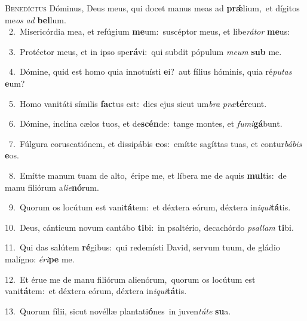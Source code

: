 \lettrine{\initial\textcolor{\initialcolor}{B}}{enedíctus} Dóminus, Deus meus, qui docet manus meas ad \textbf{prǽ}\-lium,~\star et dígitos me\textit{os} \textit{ad} \textbf{bel}\-lum.\\
{\numbfont\textcolor{\numbcolor}{~2.}}~Misericórdia mea, et refúgium \textbf{me}\-um:~\star suscéptor meus, et libe\-\textit{rá}\-\textit{tor} \textbf{me}\-us:\par
{\numbfont\textcolor{\numbcolor}{~3.}}~Protéctor meus, et in ipso spe\-\textbf{rá}\-vi:~\star qui subdit pópulum \textit{me}\-\textit{um} \textbf{sub} me.\par
{\numbfont\textcolor{\numbcolor}{~4.}}~Dómine, quid est homo quia innotuísti \textbf{e}\-i?~\star aut fílius hóminis, quia ré\-\textit{pu}\-\textit{tas} \textbf{e}\-um?\par
{\numbfont\textcolor{\numbcolor}{~5.}}~Homo vanitáti símilis \textbf{fac}\-tus est:~\star dies ejus sicut um\textit{bra} \textit{præ}\-\textbf{tér}eunt.\par
{\numbfont\textcolor{\numbcolor}{~6.}}~Dómine, inclína cælos tuos, et de\-\textbf{scén}\-de:~\star tange montes, et \textit{fu}\-\textit{mi}\textbf{gá}bunt.\par
{\numbfont\textcolor{\numbcolor}{~7.}}~Fúlgura coruscatiónem, et dissipábis \textbf{e}\-os:~\star emítte sagíttas tuas, et contur\-\textit{bá}\-\textit{bis} \textbf{e}\-os.\par
{\numbfont\textcolor{\numbcolor}{~8.}}~Emítte manum tuam de alto,~\dagger éripe me, et líbera me de aquis \textbf{mul}\-tis:~\star de manu filiórum a\-\textit{li}\-\textit{e}\textbf{nó}rum.\par
{\numbfont\textcolor{\numbcolor}{~9.}}~Quorum os locútum est vani\-\textbf{tá}\-tem:~\star et déxtera eórum, déxtera in\-\textit{i}\-\textit{qui}\textbf{tá}tis.\par
{\numbfont\textcolor{\numbcolor}{10.}}~Deus, cánticum novum cantábo \textbf{ti}\-bi:~\star in psaltério, decachórdo \textit{psal}\-\textit{lam} \textbf{ti}\-bi.\par
{\numbfont\textcolor{\numbcolor}{11.}}~Qui das salútem \textbf{ré}\-gibus:~\star qui redemísti David, servum tuum, de gládio malígno: \textit{é}\-\textit{ri}\textbf{pe} me.\par
{\numbfont\textcolor{\numbcolor}{12.}}~Et érue me de manu filiórum alienórum,~\dagger quorum os locútum est vani\-\textbf{tá}\-tem:~\star et déxtera eórum, déxtera in\-\textit{i}\-\textit{qui}\textbf{tá}tis.\par
{\numbfont\textcolor{\numbcolor}{13.}}~Quorum fílii, sicut novéllæ plantati\-\textbf{ó}\-nes~\star in juven\-\textit{tú}\-\textit{te} \textbf{su}\-a.\par
